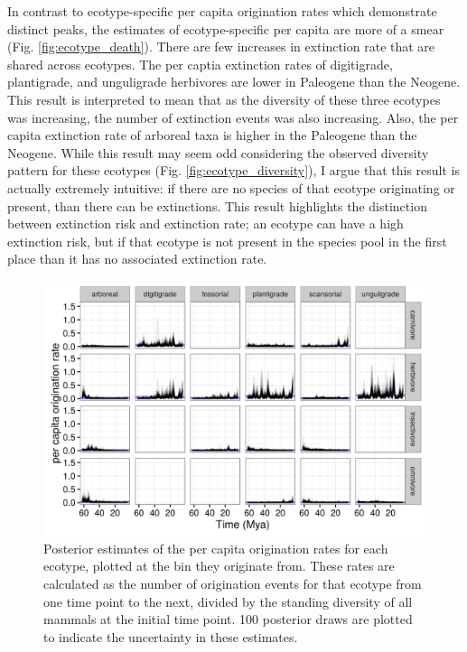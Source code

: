 In contrast to ecotype-specific per capita origination rates which demonstrate distinct peaks, the estimates of ecotype-specific per capita are more of a smear (Fig. \ref{fig:ecotype_death}). There are few increases in extinction rate that are shared across ecotypes. The per captia extinction rates of digitigrade, plantigrade, and unguligrade herbivores are lower in Paleogene than the Neogene. This result is interpreted to mean that as the diversity of these three ecotypes was increasing, the number of extinction events was also increasing. Also, the per capita extinction rate of arboreal taxa is higher in the Paleogene than the Neogene. While this result may seem odd considering the observed diversity pattern for these ecotypes (Fig. \ref{fig:ecotype_diversity}), I argue that this result is actually extremely intuitive: if there are no species of that ecotype originating or present, than there can be extinctions. This result highlights the distinction between extinction risk and extinction rate; an ecotype can have a high extinction risk, but if that ecotype is not present in the species pool in the first place than it has no associated extinction rate. 

\begin{figure}[ht]
  \centering
  \includegraphics[width=\textwidth,height=0.4\textheight,keepaspectratio=true]{chapter_coping/figure/birth_eco}
  \caption[Estimated per capita origination rates by mammal ecotype]{Posterior estimates of the per capita origination rates for each ecotype, plotted at the bin they originate from. These rates are calculated as the number of origination events for that ecotype from one time point to the next, divided by the standing diversity of all mammals at the initial time point. 100 posterior draws are plotted to indicate the uncertainty in these estimates.}
  \label{fig:ecotype_birth}
\end{figure}

